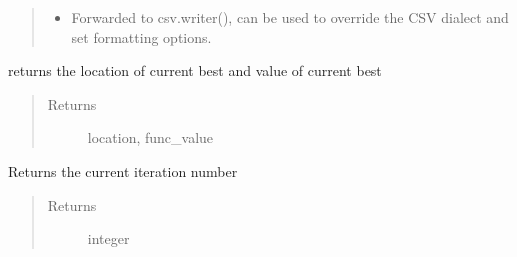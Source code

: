 \documentclass[letterpaper,12pt,english]{sphinxmanual}
\begin{document}
\begin{fulllineitems}
\begin{fulllineitems}
\begin{quote}
\begin{description}
\begin{itemize}
\item {} 
\sphinxAtStartPar
{} \textendash{} Forwarded to csv.writer(), can be used to override the CSV dialect and set formatting options.

\end{itemize}

\end{description}\end{quote}

\end{fulllineitems}


\begin{fulllineitems}
\label{\detokenize{PARyOpt:PARyOpt.paryopt.BayesOpt.get_current_best}}
\sphinxAtStartPar
returns the location of current best and value of current best
\begin{quote}\begin{description}
\item[{Returns}] \leavevmode
\sphinxAtStartPar
location, func\_value

\end{description}\end{quote}

\end{fulllineitems}


\begin{fulllineitems}
\label{\detokenize{PARyOpt:PARyOpt.paryopt.BayesOpt.get_current_iteration}}
\sphinxAtStartPar
Returns the current iteration number
\begin{quote}\begin{description}
\item[{Returns}] \leavevmode
\sphinxAtStartPar
integer

\end{description}\end{quote}

\end{fulllineitems}


\end{fulllineitems}
\end{document}
